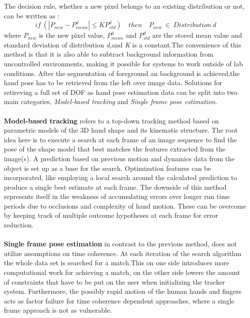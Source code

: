 The decision rule, whether a new pixel belongs to an existing distribution or not, can be written as \cite{Kristensen.Feb.2007}:
\begin{equation}
 if\ (|P_{new} −P^{d}_{mean}|\leq KP^{d}_{std})\quad then \quad P_{new}\  \in\ Distribution\ d
\end{equation}
where $P_{new}$ is the new pixel value, $P^{d}_{mean}$ and $P^{d}_{std}$ are the stored mean value and standard deviation of distribution \textit{d},and \textit{K} is a constant.The convenience of this method is that it is also able to subtract background information from uncontrolled environments, making it possible for systems to work outside of lab conditions.
After the segmentation of foreground an background is achieved,the hand pose has to be retrieved from the left over image data. Solutions for retireving a full set of DOF as hand pose estimation data can be split into two main categories\cite{Erol.2007}, \textit{Model-based tracking} and \textit{Single frame pose estimation}.\\\\
\textbf{Model-based tracking} refers to a top-down tracking method based on parametric models of the 3D hand shape and its kinematic structure. The root idea here is to execute a search at each frame of an image sequence to find the pose of the shape model that best matches the features extracted from the image(s). A prediction based on previous motion and dynamics data from the object is set up as a base for the search. Optimization features can be incorporated, like employing a local search around the calculated prediction to produce a single best estimate at each frame. The downside of this method represents itself in the weakness of accumulating errors over longer run time periods due to occlusions and complexity of hand motion. These can be overcome by keeping track of multiple outcome hypotheses at each frame for error reduction.
\\\\
\textbf{Single frame pose estimation} in contrast to the previous method, does not utilize assumptions on time coherence. At each iteration of the search algorithm the whole data set is searched for a match.This on one side introduces more computational work for achieving a match, on the other side lowers the amount of constraints that have to be put on the user when initializing the tracker system. Furthermore, the possibly rapid motion of the human hands and fingers acts as factor failure for time coherence dependent approaches, where a single frame approach is not as vulnerable.
